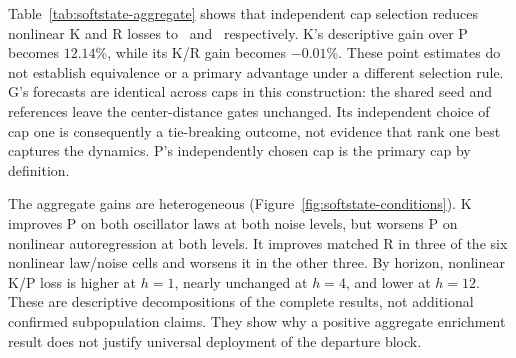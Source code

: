 \begin{table}[t]
\centering\small
\caption{Complete primary family for the P-selected shared bank.
Gain is $100(1-\overline L_a/\overline L_b)$; negative gain denotes
higher candidate loss. The margin-adjusted difference is
$d=L_a-cL_b$, with $c=0.97$ for superiority and $1.05$ for
noninferiority. A criterion is established only when its simultaneous
one-sided upper endpoint is below zero. The independent units are
the \SARepetitions\ repetition aggregates.}
\label{tab:softstate-primary}

\end{table}

\begin{table}[t]
\centering\small
\caption{Mean variance-normalized terminal loss and standard deviation
across repetitions. The shared bank is selected by P. Independent
per-arm cap selection is a secondary procedure comparison; its
outcomes cannot replace a primary criterion. Standard deviations
describe repetitions and are not confidence intervals.}
\label{tab:softstate-aggregate}

\end{table}

Table~\ref{tab:softstate-aggregate} shows that independent cap selection
reduces nonlinear K and R losses to \SALossIndependentNonlinearK\ and
\SALossIndependentNonlinearR\ respectively. K's descriptive gain over
P becomes $12.14\%$, while its K/R gain becomes $-0.01\%$.
These point estimates do not establish equivalence or a primary
advantage under a different selection rule. G's forecasts are identical
across caps in this construction: the shared seed and references leave
the center-distance gates unchanged. Its independent choice of cap one
is consequently a tie-breaking outcome, not evidence that rank one
best captures the dynamics. P's independently chosen cap is the
primary cap by definition.

The aggregate gains are heterogeneous
(Figure~\ref{fig:softstate-conditions}). K improves P on both oscillator
laws at both noise levels, but worsens P on nonlinear autoregression
at both levels. It improves matched R in three of the six nonlinear
law/noise cells and worsens it in the other three. By horizon, nonlinear
K/P loss is higher at $h=1$, nearly unchanged at $h=4$, and lower at
$h=12$. These are descriptive decompositions of the complete results,
not additional confirmed subpopulation claims. They show why a
positive aggregate enrichment result does not justify universal
deployment of the departure block.

